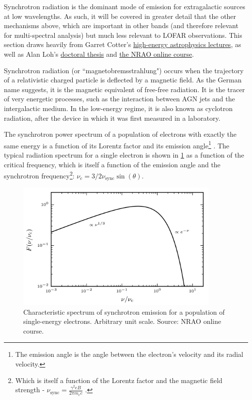 \pg
Synchrotron radiation is the dominant mode of emission for extragalactic sources at low wavelengths. As such, it will be covered in greater detail that the other mechanisms above, which are important in other bands (and therefore relevant for multi-spectral analysis) but much less relevant to LOFAR observations. This section draws heavily from Garret Cotter's \href{http://www-astro.physics.ox.ac.uk/~garret/teaching/}{high-energy astrophysics lectures}, as well as Alan Loh's \href{http://theses.md.univ-paris-diderot.fr/LOH_Alan_2_va_20160930.pdf}{doctoral thesis} and \href{https://www.cv.nrao.edu/course/astr534/SelfAbsorption.html}{the NRAO online course}.

\pg
Synchrotron radiation (or ``magnetobremsstrahlung") occurs when the trajectory of a relativistic charged particle is deflected by a magnetic field. As the German name suggests, it is the magnetic equivalent of free-free radiation. It is the tracer of very energetic processes, such as the interaction between AGN jets and the intergalactic medium. In the low-energy regime, it is also known as cyclotron radiation, after the device in which it was first measured in a laboratory. %

\pg
The synchrotron power spectrum of a population of electrons with exactly the same energy is a function of its Lorentz factor and its emission angle\footnote{The emission angle is the angle between the electron's velocity and its radial velocity.} . The typical radiation spectrum for a single electron is shown in \cref{fig.synchrotron.1electrion} as a function of the critical frequency, which is itself a function of the emission angle and the synchrotron frequency\footnote{Which is itself a function of the Lorentz factor and the magnetic field strength - $\nu_\mathrm{sync}=\frac{\gamma^2 e B}{2\pi m_e c}$ .}: $\nu_c=3/2\nu_\mathrm{sync}\sin(\theta)$.
\begin{figure}[!h]
\centering
\includegraphics[width=0.9\textwidth]{images/Synchrotron-single-electron.png}
\caption{\label{fig.synchrotron.1electrion} Characteristic spectrum of synchrotron emission for a population of single-energy electrons. Arbitrary unit scale. Source: NRAO online course.}
\end{figure}

